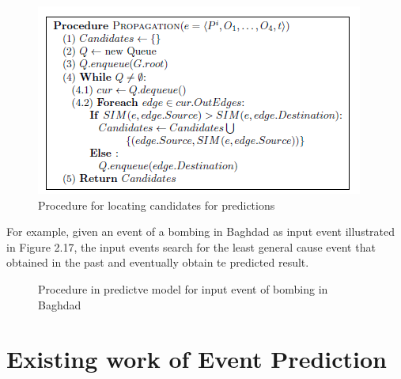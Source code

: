 \documentclass[twoside]{utmthesis}
\begin{document}
\begin{figure}[H]
	\centering
	\includegraphics[width=0.7\linewidth]{diagram/propagate}
	\caption{Procedure for locating candidates for predictions \citep{radinsky2014pundit}}
	\label{fig:propagate}
\end{figure}
\vspace{-1cm}
For example, given an event of a bombing in Baghdad as input event illustrated in Figure 2.17, the input events search for the least general cause event that obtained in the past and eventually obtain te predicted result. 
\begin{figure}[H]
	\centering
	\caption{Procedure in predictve model for input event of bombing in Baghdad \citep{radinsky2014pundit}}
	\label{fig:abstractiontree}
\end{figure}
\vspace{-1cm}



\section{Existing work of Event Prediction}
\end{document}
